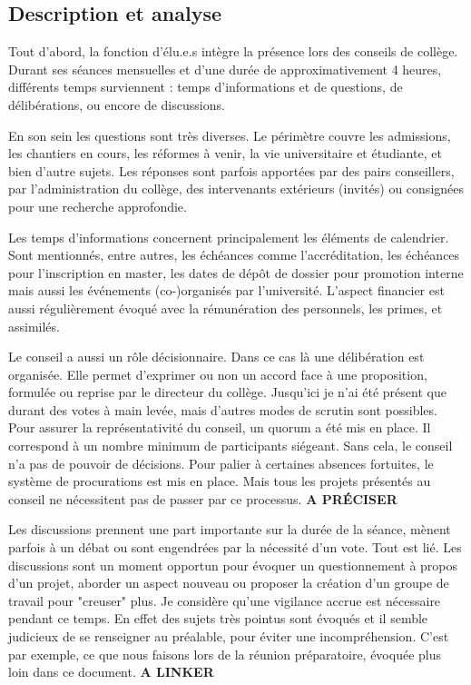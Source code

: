 \documentclass{article}
\begin{document}
\subsection{Description et analyse}
Tout d'abord, la fonction d'élu.e.s intègre la présence lors des conseils de collège. 
Durant ses séances mensuelles et d'une durée de approximativement 4 heures, différents temps surviennent : temps d'informations et de questions, de délibérations, ou encore de discussions.

En son sein les questions sont très diverses. 
Le périmètre couvre les admissions, les chantiers en cours, les réformes à venir, la vie universitaire et étudiante, et bien d'autre sujets. 
Les réponses sont parfois apportées par des pairs conseillers, par l'administration du collège, des intervenants extérieurs (invités) ou consignées pour une recherche approfondie. 

Les temps d'informations concernent principalement les éléments de calendrier. 
Sont mentionnés, entre autres, les échéances comme l'accréditation, les échéances pour l'inscription en master, les dates de dépôt de dossier pour promotion interne mais aussi les événements (co-)organisés par l'université. 
L'aspect financier est aussi régulièrement évoqué avec la rémunération des personnels, les primes, et assimilés.

Le conseil a aussi un rôle décisionnaire. 
Dans ce cas là une délibération est organisée. 
Elle permet d'exprimer ou non un accord face à une proposition, formulée ou reprise par le directeur du collège. 
Jusqu'ici je n'ai été présent que durant des votes à main levée, mais d'autres modes de scrutin sont possibles. \\ 
Pour assurer la représentativité du conseil, un quorum a été mis en place. Il correspond à un nombre minimum de participants siégeant. Sans cela, le conseil n'a pas de pouvoir de décisions. 
Pour palier à certaines absences fortuites, le système de procurations est mis en place. 
Mais tous les projets présentés au conseil ne nécessitent pas de passer par ce processus. \textbf{A PRÉCISER}

Les discussions prennent une part importante sur la durée de la séance, mènent parfois à un débat ou sont engendrées par la nécessité d'un vote. Tout est lié. Les discussions sont un moment opportun pour évoquer un questionnement à propos d'un projet, aborder un aspect nouveau ou proposer la création d'un groupe de travail pour "creuser" plus. Je considère qu'une vigilance accrue est nécessaire pendant ce temps. En effet des sujets très pointus sont évoqués et il semble judicieux de se renseigner au préalable, pour éviter une incompréhension. C'est par exemple, ce que nous faisons lors de la réunion préparatoire, évoquée plus loin dans ce document. \textbf{A LINKER}
\end{document}
